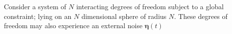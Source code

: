 Consider a system of $N$ interacting degrees of freedom subject to a global constraint; lying on an $N$ dimensional sphere of radius $N$. These degrees of freedom may also experience an external noise $\mathbf\eta(t)$